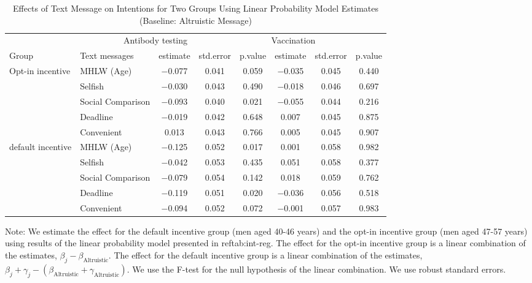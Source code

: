 \begin{table}

\caption{Effects of Text Message on Intentions for Two Groups Using Linear Probability Model Estimates (Baseline: Altruistic Message) \label{tab:int-reg-ftest2}}
\centering
\fontsize{9}{11}\selectfont
\begin{threeparttable}
\begin{tabular}[t]{>{\raggedright\arraybackslash}p{5em}lcccccc}
\toprule
\multicolumn{2}{c}{ } & \multicolumn{3}{c}{Antibody testing} & \multicolumn{3}{c}{Vaccination} \\
\cmidrule(l{3pt}r{3pt}){3-5} \cmidrule(l{3pt}r{3pt}){6-8}
Group & Text messages & estimate & std.error & p.value & estimate  & std.error  & p.value \\
\midrule
Opt-in incentive & MHLW (Age) & \num{-0.077} & \num{0.041} & \num{0.059} & \num{-0.035} & \num{0.045} & \num{0.440}\\
 & Selfish & \num{-0.030} & \num{0.043} & \num{0.490} & \num{-0.018} & \num{0.046} & \num{0.697}\\
 & Social Comparison & \num{-0.093} & \num{0.040} & \num{0.021} & \num{-0.055} & \num{0.044} & \num{0.216}\\
 & Deadline & \num{-0.019} & \num{0.042} & \num{0.648} & \num{0.007} & \num{0.045} & \num{0.875}\\
 & Convenient & \num{0.013} & \num{0.043} & \num{0.766} & \num{0.005} & \num{0.045} & \num{0.907}\\
default incentive & MHLW (Age) & \num{-0.125} & \num{0.052} & \num{0.017} & \num{0.001} & \num{0.058} & \num{0.982}\\
 & Selfish & \num{-0.042} & \num{0.053} & \num{0.435} & \num{0.051} & \num{0.058} & \num{0.377}\\
 & Social Comparison & \num{-0.079} & \num{0.054} & \num{0.142} & \num{0.018} & \num{0.059} & \num{0.762}\\
 & Deadline & \num{-0.119} & \num{0.051} & \num{0.020} & \num{-0.036} & \num{0.056} & \num{0.518}\\
 & Convenient & \num{-0.094} & \num{0.052} & \num{0.072} & \num{-0.001} & \num{0.057} & \num{0.983}\\
\bottomrule
\end{tabular}
\begin{tablenotes}
\item Note: We estimate the effect for the default incentive group (men aged 40-46 years) and the opt-in incentive group (men aged 47-57 years) using results of the linear probability model presented in ref{tab:int-reg}. The effect for the opt-in incentive group is a linear combination of the estimates, $\beta_j - \beta_{\text{Altruistic}}$. The effect for the default incentive group is a linear combination of the estimates, $\beta_j + \gamma_j - (\beta_{\text{Altruistic}} + \gamma_{\text{Altruistic}})$. We use the F-test for the null hypothesis of the linear combination. We use robust standard errors.
\end{tablenotes}
\end{threeparttable}
\end{table}
